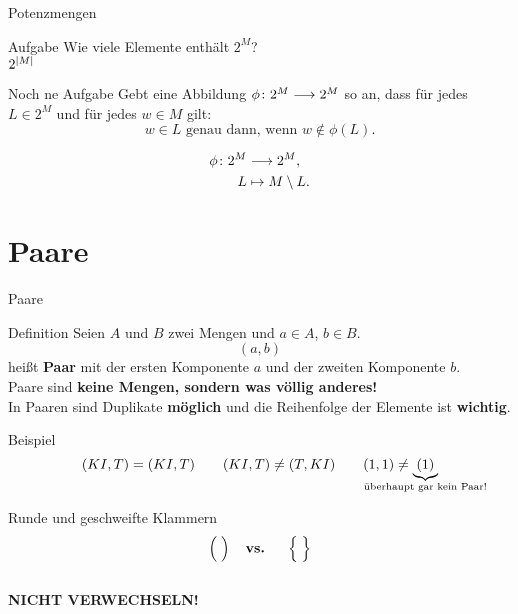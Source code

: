 \begin{frame}{Potenzmengen}
	\begin{block}{Aufgabe}
		Wie viele Elemente enthält $2^M$? \\[0.5em]
		
		\pause
		$2^{\left\lvert M \right\rvert}$
	\end{block}
	
	\pause
	\begin{block}{Noch ne Aufgabe}
		Gebt eine Abbildung $\phi \colon 2^{M} \longrightarrow 2^{M}$ so an,
		dass für jedes $L \in 2^{M}$ und für jedes $w \in M$ gilt:
		\begin{equation*}
			w \in L \text{ genau dann, wenn } w \notin \phi(L).
		\end{equation*}
		
		\pause
		\begin{align*}
			\phi \colon 2^{M} &\longrightarrow 2^{M},\\
			L &\mapsto M \setminus L.
		\end{align*}
	\end{block}
\end{frame}

\section{Paare}

\begin{frame}{Paare}
	\begin{block}{Definition}
		Seien $A$ und $B$ zwei Mengen und $a \in A$, $b \in B$.\\
		$$(a, b)$$ heißt \textbf{Paar} mit der ersten Komponente $a$ und der zweiten Komponente $b$.\\[1em]
		\pause
		Paare sind \textbf{keine Mengen, sondern was \alert{völlig anderes}!} \\
		In Paaren sind Duplikate \textbf{möglich} und die Reihenfolge der Elemente ist \textbf{wichtig}.\\
	\end{block}

	\pause
	\begin{block}{Beispiel}
		$$ (KI, T) = (KI, T) \qquad (KI, T) \neq (T, KI) \qquad (1, 1) \neq \underbrace{(1)}_{\mathclap{\text{überhaupt gar kein Paar!}}} $$
	\end{block}
\end{frame}

\begin{frame}
	\centering
	\Huge
	\alert{Runde und geschweifte Klammern 
		   $$\Big(\;\Big) \textbf{\quad vs. \quad} \Big\{\;\Big\}$$ \\
		   \textbf{NICHT VERWECHSELN!}}
\end{frame}

